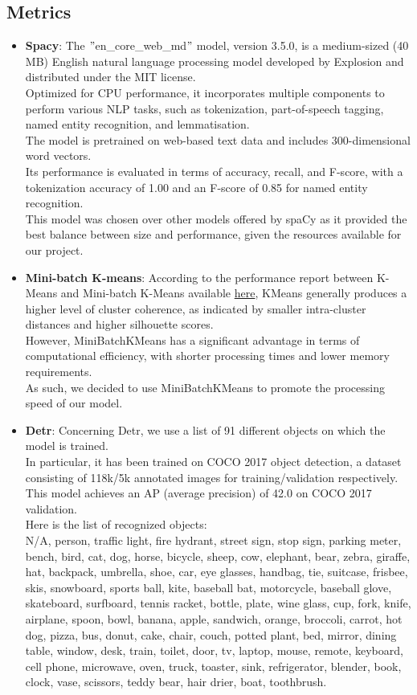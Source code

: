 \documentclass{article}
\begin{document}
    \subsection{Metrics}\label{subsec:metrics}
    \begin{itemize}
        \item \textbf{Spacy}: The \("\)en\_core\_web\_md\("\) model, version 3.5.0, is a medium-sized (40 MB) English natural language processing model developed by Explosion and distributed under the MIT license.\\Optimized for CPU performance, it incorporates multiple components to perform various NLP tasks, such as tokenization, part-of-speech tagging, named entity recognition, and lemmatisation.\\The model is pretrained on web-based text data and includes 300-dimensional word vectors.\\Its performance is evaluated in terms of accuracy, recall, and F-score, with a tokenization accuracy of 1.00 and an F-score of 0.85 for named entity recognition.\\This model was chosen over other models offered by spaCy as it provided the best balance between size and performance, given the resources available for our project.
        \item \textbf{Mini-batch K-means}: According to the performance report between K-Means and Mini-batch K-Means available \href{https://upcommons.upc.edu/bitstream/handle/2117/23414/R13-8.pdf}{here}, KMeans generally produces a higher level of cluster coherence, as indicated by smaller intra-cluster distances and higher silhouette scores.\\However, MiniBatchKMeans has a significant advantage in terms of computational efficiency, with shorter processing times and lower memory requirements.\\As such, we decided to use MiniBatchKMeans to promote the processing speed of our model.
        \item \textbf{Detr}: Concerning Detr, we use a list of 91 different objects on which the model is trained.\\In particular, it has been trained on COCO 2017 object detection, a dataset consisting of 118k/5k annotated images for training/validation respectively.\\This model achieves an AP (average precision) of 42.0 on COCO 2017 validation.\\Here is the list of recognized objects:\\N/A, person, traffic light, fire hydrant, street sign, stop sign, parking meter, bench, bird, cat, dog, horse, bicycle, sheep, cow, elephant, bear, zebra, giraffe, hat, backpack, umbrella, shoe, car, eye glasses, handbag, tie, suitcase, frisbee, skis, snowboard, sports ball, kite, baseball bat, motorcycle, baseball glove, skateboard, surfboard, tennis racket, bottle, plate, wine glass, cup, fork, knife, airplane, spoon, bowl, banana, apple, sandwich, orange, broccoli, carrot, hot dog, pizza, bus, donut, cake, chair, couch, potted plant, bed, mirror, dining table, window, desk, train, toilet, door, tv, laptop, mouse, remote, keyboard, cell phone, microwave, oven, truck, toaster, sink, refrigerator, blender, book, clock, vase, scissors, teddy bear, hair drier, boat, toothbrush.

\end{itemize}
\end{document}
